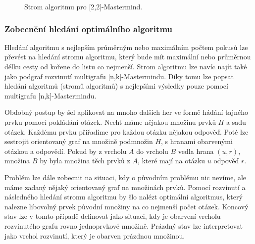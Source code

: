 \begin{figure}[h!]
    \centering
    \caption{Strom algoritmu pro [2,2]-Mastermind.}
\label{figprikladstromualgoritmu}
\end{figure}

\subsubsection{Zobecnění hledání optimálního algoritmu}
Hledání algoritmu s nejlepším průměrným nebo maximálním počtem pokusů lze převést na hledání stromu algoritmu, který bude mít maximální nebo průměrnou délku cesty od kořene do listu co nejmenší. Strom algoritmu lze navíc najít také jako podgraf rozvinutí multigrafu [n,k]-Mastermindu. Díky tomu lze popsat hledání algoritmů (stromů algoritmů) s nejlepšími výsledky pouze pomocí multigrafu [n,k]-Mastermindu. 

Obdobný postup by šel aplikovat na mnoho dalších her ve formě hádání tajného prvku pomocí pokládání otázek. Nechť máme nějakou množinu prvků $H$ a sadu otázek. Každému prvku přiřadíme pro každou otázku nějakou odpověď. Poté lze sestrojit orientovaný graf na množině podmnožin $H$, s hranami obarvenými otázkou a odpovědí. Pokud by z vrcholu $A$ do vrcholu $B$ vedla hrana $(u,r)$, množina $B$ by byla množina těch prvků z $A$, které mají na otázku $u$ odpověď $r$. 

Problém lze dále zobecnit na situaci, kdy o původním problému nic nevíme, ale máme zadaný nějaký orientovaný graf na množinách prvků. Pomocí rozvinutí a následného hledání stromu algoritmu by šlo nalézt optimální algoritmus, který nalezne libovolný prvek původní množiny na co nejmenší počet otázek. Koncový stav lze v tomto případě definovat jako situaci, kdy je obarvení vrcholu rozvinutého grafu rovno jednoprvkové množině. Prázdný stav lze interpretovat jako vrchol rozvinutí, který je obarven prázdnou množinou. 

